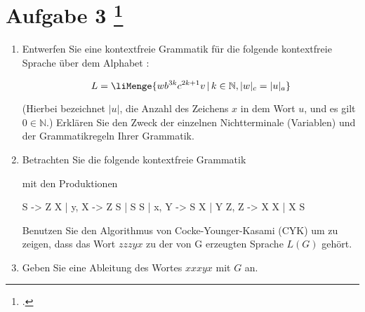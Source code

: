 \documentclass{lehramt-informatik-aufgabe}
\begin{document}
\let\m=\liMenge

\section{Aufgabe 3
\footcite{66115:2018:09}}

\begin{enumerate}


\item Entwerfen Sie eine kontextfreie Grammatik für die folgende
kontextfreie Sprache über dem Alphabet :

\begin{displaymath}
L=\m{ w b^{3k} c^{2k+1} v \, | \, k \in \mathbb{N}, |w|_c= |u|_a}
\end{displaymath}

(Hierbei bezeichnet $|u|$, die Anzahl des Zeichens $x$ in dem Wort $u$,
und es gilt $0 \in \mathbb{N}$.) Erklären Sie den Zweck der einzelnen
Nichtterminale (Variablen) und der Grammatikregeln Ihrer Grammatik.


\item Betrachten Sie die folgende kontextfreie Grammatik

\begin{center}
\end{center}

mit den Produktionen

\begin{liProduktionsRegeln}
S -> Z X | y,
X -> Z S | S S | x,
Y -> S X | Y Z,
Z -> X X | X S
\end{liProduktionsRegeln}

Benutzen Sie den Algorithmus von Cocke-Younger-Kasami (CYK) um zu
zeigen, dass das Wort $zzzyx$ zu der von G erzeugten Sprache $L(G)$
gehört.


\item Geben Sie eine Ableitung des Wortes $xxxyx$ mit $G$ an.

\end{enumerate}
\end{document}

